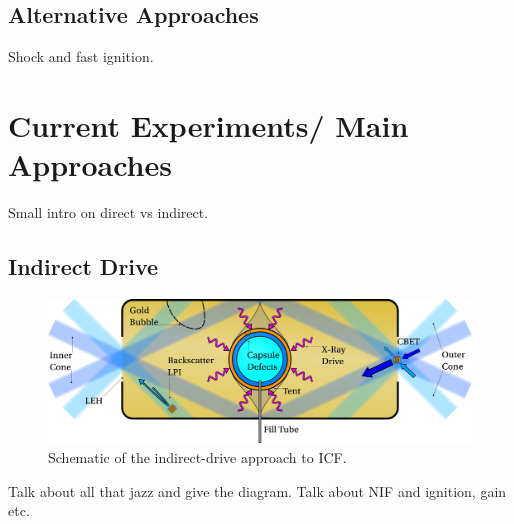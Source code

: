 \subsection{Alternative Approaches}%
\label{sec:intro_icf_alt}

Shock and fast ignition.

\section{Current Experiments/ Main Approaches}%
\label{sec:intro_ICF}

Small intro on direct vs indirect.

\subsection{Indirect Drive}%
\label{sec:intro_indirect}

\begin{figure}[t!]
    \includegraphics[width=\linewidth]{Introduction/Images/indirect icf white.png}
    \centering
    \caption{Schematic of the indirect-drive approach to \ac{ICF}.
    }%
    \label{fig:intro_indirect}
\end{figure}

Talk about all that jazz and give the diagram.
Talk about NIF and ignition, gain etc.

